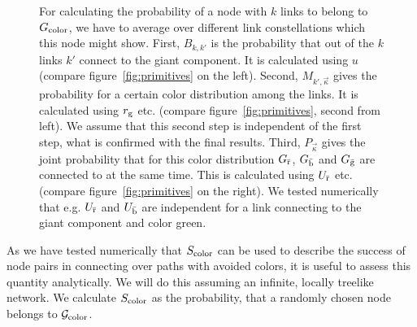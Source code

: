 \documentclass[aps, pre, onecolumn, a4paper, floatfix]{revtex4}
\begin{document}
\begin{figure}[htb]
\begin{minipage}[b]{0.6\linewidth}
  \end{minipage}
    \caption{For calculating the probability of a node with $k$ links to belong to 
    $G_{\rm color}$, we have to average over different link constellations which this node 
    might show. First, $B_{k,k'}$ is the probability that out of the $k$ links $k'$ 
    connect to the giant component. It is calculated using $u$ (compare figure~\ref{fig:primitives} 
    on the left). Second, $M_{k',\vec{\kappa}}$ gives the probability for a certain color 
    distribution among the links. It is calculated using $r_{\rm g}$ etc. (compare 
    figure~\ref{fig:primitives}, second from left). We assume that this second step is 
    independent of the first step, what is confirmed with the final results. Third, 
    $P_{\vec \kappa}$ gives the joint probability that for this color distribution 
    $G_{\bar{\rm r}}$, $G_{\bar{\rm b}}$ and $G_{\bar{\rm g}}$ are connected to at 
    the same time. This is calculated using $U_{\bar{\rm r}}$ etc. (compare 
    figure~\ref{fig:primitives} on the right). We tested numerically that e.g. 
    $U_{\bar{\rm r}}$ and $U_{\bar{\rm b}}$ are independent for a link connecting 
    to the giant component and color green.}
    \label{fig:1}
\end{figure}




As we have tested numerically that $S_{\rm color}$ can be used to describe the success of node 
pairs in connecting over paths with avoided colors, it is useful to assess this quantity 
analytically. We will do this assuming an infinite, locally treelike network. 
We calculate $S_{\rm color}$ as the probability, that a randomly chosen node belongs to 
${\mathcal G}_{\rm color}$. 
\end{document}
